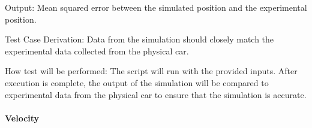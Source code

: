 \documentclass[12pt, titlepage]{article}
\begin{document}
\begin{enumerate}
  Output: Mean squared error between the simulated position and the experimental position.

  Test Case Derivation: Data from the simulation should closely match the experimental data collected from the physical car.

  How test will be performed: The script will run with the provided inputs. After execution is complete, the output of the simulation will be compared to experimental data from the physical car to ensure that the simulation is accurate.

\end{enumerate}
		
\paragraph{Velocity}
\end{document}
